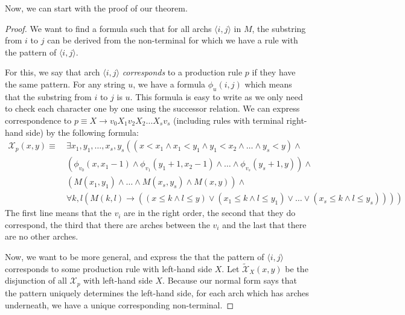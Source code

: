 Now, we can start with the proof of our theorem.
\begin{proof}
    We want to find a formula such that for all archs $\langle i, j \rangle$ in $M$, the substring from $i$ to $j$ can be derived from the non-terminal for which we have a rule with the pattern of $\langle i, j \rangle$.

    For this, we say that arch $\langle i, j \rangle$ \emph{corresponds} to a production rule $p$ if they have the same pattern.
    For any string $u$, we have a formula $\phi_u(i, j)$ which means that the substring from $i$ to $j$ is $u$.
    This formula is easy to write as we only need to check each character one by one using the successor relation.
    We can express correspondence to $p \equiv X \to v_{0}X_{1}v_{2}X_{2}\dots X_{s}v_{s}$ (including rules with terminal right-hand side) by the following formula:
    \begin{align*}
        \mathcal{X}_p(x, y) \equiv~&\exists x_1, y_1, \dots, x_s, y_s \left(\left(x < x_1 \land x_1 < y_1 \land y_1 < x_2 \land \dots \land y_s < y \right) \land \right. \\
        &\left. \left(\phi_{v_0}(x, x_1 - 1) \land \phi_{v_1}(y_1 + 1, x_2 - 1) \land \dots \land \phi_{v_s}(y_s + 1, y)\right) \land \right. \\
        &\left. \left(M(x_1, y_1) \land \dots \land M(x_s, y_s) \land M(x, y) \right) \land \right. \\
        &\left. \forall k, l \left(M(k, l) \to \left((x \leq k \land l \leq y) \lor (x_1 \leq k \land l \leq y_1) \lor \dots \lor (x_s \leq k \land l \leq y_s)\right)\right) \right)
    \end{align*}
    The first line means that the $v_i$ are in the right order, the second that they do correspond, the third that there are arches between the $v_i$ and the last that there are no other arches.

    Now, we want to be more general, and express the that the pattern of $\langle i, j \rangle$ corresponds to some production rule with left-hand side $X$.
    Let $\widetilde{\mathcal{X}}_X(x, y)$ be the disjunction of all $\mathcal{X}_p$ with left-hand side $X$.
    Because our normal form says that the pattern uniquely determines the left-hand side, for each arch which has arches underneath, we have a unique corresponding non-terminal.


\end{proof}
